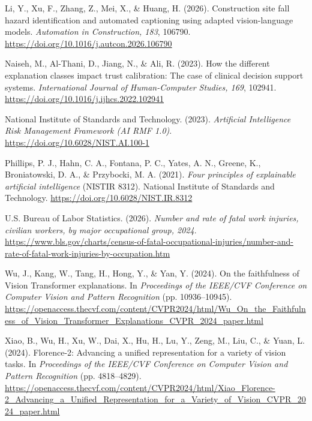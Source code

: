 \documentclass[12pt,letterpaper,twoside]{article}
\newenvironment{apareferences}
  {\begin{list}{}{%
    \setlength{\leftmargin}{0.5in}%
    \setlength{\itemindent}{-0.5in}%
    \setlength{\itemsep}{0pt}%
    \setlength{\parsep}{0pt}%
    \setlength{\topsep}{0pt}}}
  {\end{list}}
\begin{document}
\begin{apareferences}
\item Li, Y., Xu, F., Zhang, Z., Mei, X., \& Huang, H. (2026). Construction site fall hazard identification and automated captioning using adapted vision-language models. \textit{Automation in Construction, 183}, 106790. \url{https://doi.org/10.1016/j.autcon.2026.106790}

\item Naiseh, M., Al-Thani, D., Jiang, N., \& Ali, R. (2023). How the different explanation classes impact trust calibration: The case of clinical decision support systems. \textit{International Journal of Human-Computer Studies, 169}, 102941. \url{https://doi.org/10.1016/j.ijhcs.2022.102941}

\item National Institute of Standards and Technology. (2023). \textit{Artificial Intelligence Risk Management Framework (AI RMF 1.0)}. \url{https://doi.org/10.6028/NIST.AI.100-1}

\item Phillips, P. J., Hahn, C. A., Fontana, P. C., Yates, A. N., Greene, K., Broniatowski, D. A., \& Przybocki, M. A. (2021). \textit{Four principles of explainable artificial intelligence} (NISTIR 8312). National Institute of Standards and Technology. \url{https://doi.org/10.6028/NIST.IR.8312}

\item U.S. Bureau of Labor Statistics. (2026). \textit{Number and rate of fatal work injuries, civilian workers, by major occupational group, 2024}. \url{https://www.bls.gov/charts/census-of-fatal-occupational-injuries/number-and-rate-of-fatal-work-injuries-by-occupation.htm}

\item Wu, J., Kang, W., Tang, H., Hong, Y., \& Yan, Y. (2024). On the faithfulness of Vision Transformer explanations. In \textit{Proceedings of the IEEE/CVF Conference on Computer Vision and Pattern Recognition} (pp. 10936--10945). \url{https://openaccess.thecvf.com/content/CVPR2024/html/Wu_On_the_Faithfulness_of_Vision_Transformer_Explanations_CVPR_2024_paper.html}

\item Xiao, B., Wu, H., Xu, W., Dai, X., Hu, H., Lu, Y., Zeng, M., Liu, C., \& Yuan, L. (2024). Florence-2: Advancing a unified representation for a variety of vision tasks. In \textit{Proceedings of the IEEE/CVF Conference on Computer Vision and Pattern Recognition} (pp. 4818--4829). \url{https://openaccess.thecvf.com/content/CVPR2024/html/Xiao_Florence-2_Advancing_a_Unified_Representation_for_a_Variety_of_Vision_CVPR_2024_paper.html}
\end{apareferences}
\end{document}
